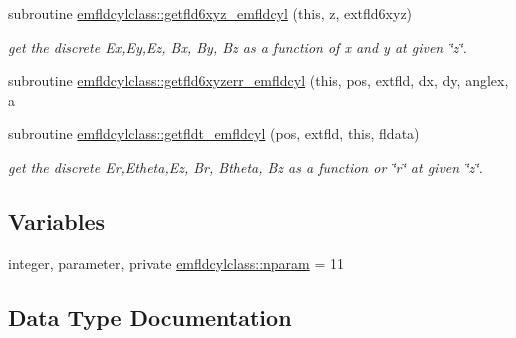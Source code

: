 \begin{DoxyCompactItemize}
\item 
subroutine \mbox{\hyperlink{namespaceemfldcylclass_a6e565db42720101fd24fc991842be210}{emfldcylclass\+::getfld6xyz\+\_\+emfldcyl}} (this, z, extfld6xyz)
\begin{DoxyCompactList}\small\item\em get the discrete Ex,Ey,Ez, Bx, By, Bz as a function of x and y at given \char`\"{}z\char`\"{}. \end{DoxyCompactList}\item 
subroutine \mbox{\hyperlink{namespaceemfldcylclass_a36c2a6787aeb8c71d2f4886e40e2e0e2}{emfldcylclass\+::getfld6xyzerr\+\_\+emfldcyl}} (this, pos, extfld, dx, dy, anglex, a
\item 
subroutine \mbox{\hyperlink{namespaceemfldcylclass_a82e58a65bbe911b6f676ddb81868db31}{emfldcylclass\+::getfldt\+\_\+emfldcyl}} (pos, extfld, this, fldata)
\begin{DoxyCompactList}\small\item\em get the discrete Er,Etheta,Ez, Br, Btheta, Bz as a function or \char`\"{}r\char`\"{} at given \char`\"{}z\char`\"{}. \end{DoxyCompactList}\end{DoxyCompactItemize}
\subsection*{Variables}
\begin{DoxyCompactItemize}
\item 
integer, parameter, private \mbox{\hyperlink{namespaceemfldcylclass_a4b336ecf0cd4052beb8ac386391e19e9}{emfldcylclass\+::nparam}} = 11
\end{DoxyCompactItemize}


\subsection{Data Type Documentation}
\label{structemfldcylclass_1_1emfldcyl}
